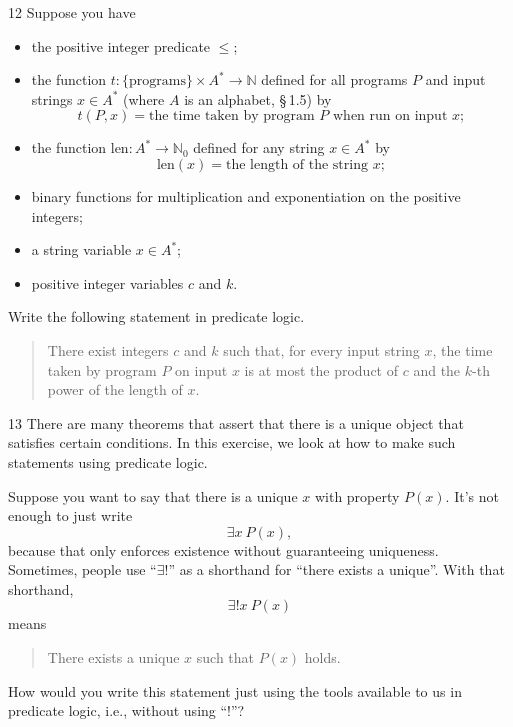 \documentclass[11pt]{article}
\begin{document}
\begin{exercise}{12}
    Suppose you have
    \begin{itemize}
        \item the positive integer predicate $\leq$;
        \item the function $t\colon \{\text{programs}\}\times A^*\to\mathbb{N}$
            defined for all programs $P$ and input strings $x\in A^*$
            (where $A$ is an alphabet, \S\,1.5) by
            \[
            t(P,x) = \text{the time taken by program } P \text{ when run on input } x;
            \]
        \item the function $\text{len}\colon A^*\to\mathbb{N}_0$
            defined for any string $x\in A^*$ by
            \[
            \text{len}(x) = \text{the length of the string } x;
            \]
        \item binary functions for multiplication and exponentiation on
            the positive integers;
        \item a string variable $x\in A^*$;
        \item positive integer variables $c$ and $k$.
    \end{itemize}
    Write the following statement in predicate logic.
    \begin{quote}
        There exist integers $c$ and $k$ such that, for every input
        string $x$, the time taken by program $P$ on input $x$ is at
        most the product of $c$ and the $k$-th power of the length of
        $x$.
    \end{quote}
\end{exercise}

\begin{exercise}{13}
    There are many theorems that assert that there is a unique object
    that satisfies certain conditions. In this exercise, we look at how
    to make such statements using predicate logic.

    Suppose you want to say that there is a unique $x$ with property
    $P(x)$. It's not enough to just write
    \[
    \exists x\ P(x),
    \]
    because that only enforces existence without guaranteeing
    uniqueness. Sometimes, people use ``$\exists !$'' as a shorthand
    for ``there exists a unique''. With that shorthand,
    \[
    \exists ! x\ P(x)
    \]
    means

    \begin{quote}
        There exists a unique $x$ such that $P(x)$ holds.
    \end{quote}

    How would you write this statement just using the tools available
    to us in predicate logic, i.e., without using ``$!$''?
\end{exercise}
\end{document}
